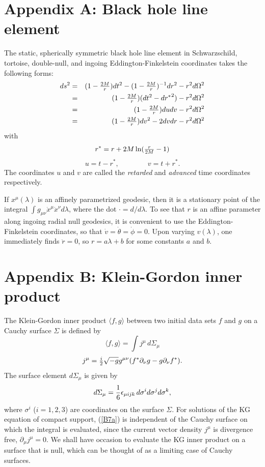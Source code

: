 \documentclass[12pt]{article}
\def\la{\langle}
\def\ra{\rangle}
\begin{document}
\section*{Appendix A: Black hole line element}

The static, spherically symmetric black hole line element
in Schwarzschild, tortoise, double-null, and ingoing
Eddington-Finkelstein coordinates takes the following forms:
\begin{eqnarray} ds^2&=
&(1-{\textstyle{2M\over r}}) dt^2
-(1-{\textstyle{2M\over r}})^{-1} dr^2
-r^2d\Omega^2\\
&=&(1-{\textstyle{2M\over r}}) (dt^2-d{r^*}^2)-r^2d\Omega^2\\
&=&(1-{\textstyle{2M\over r}}) dudv- r^2d\Omega^2\\
&=& (1-{\textstyle{2M\over r}}) dv^2-2 dvdr-r^2d\Omega^2
\end{eqnarray}
with
\begin{equation}
r^*=r+2M\ln({\textstyle{r\over2M}}-1)
\label{tortoise}
\end{equation}
\begin{equation}u=t-r^*,\qquad\qquad v=t+r^*.
\label{uv}
\end{equation}
The coordinates $u$ and $v$ are called the {\it retarded} and
{\it advanced} time coordinates respectively.

If $x^{\mu}(\lambda)$ is an affinely parametrized
geodesic, then it is a stationary point of the integral
$\int g_{\mu\nu}\dot{x}^{\mu}\dot{x}^{\nu} d\lambda$, where
the dot $\cdot=d/d\lambda$.
To see that $r$ is an affine parameter along ingoing radial
null geodesics, it is convenient to use the
Eddington-Finkelstein coordinates, so that
$\dot{v}=\dot{\theta}=\dot{\phi}=0$. Upon varying
$v(\lambda)$, one immediately finds $\ddot{r}=0$,
so $r=a\lambda+b$ for some constants $a$
and $b$.

\section*{Appendix B: Klein-Gordon inner product}

The Klein-Gordon inner product $\la f,g\ra$ between two
initial data sets $f$ and $g$ on a Cauchy
surface $\Sigma$ is defined by
\begin{equation}
\la f,g\ra=\int j^\mu \, d\Sigma_{\mu}
\label{B7a}
\end{equation}
\begin{equation}
j^\mu= {\textstyle {i\over2}}\sqrt{-g}g^{\mu\nu}(f^*\partial_\nu
g-g\partial_\nu f^*).
\end{equation}
The surface element $d\Sigma_\mu$ is given by
\begin{equation}
d\Sigma_\mu={1\over6}\epsilon_{\mu ijk}\, d\sigma^i
d\sigma^j d\sigma^k,
\end{equation}
where $\sigma^i$ ($i=1,2,3$) are coordinates on the surface
$\Sigma$. For solutions of the KG equation of compact
support, (\ref{B7a}) is independent of the Cauchy surface on which
the integral is evaluated, since the current vector density
$j^\mu$ is divergence free, $\partial_\mu j^\mu=0$.
We shall have occasion to evaluate the KG inner product on a
surface that is null, which can be thought of as a limiting
case of Cauchy surfaces.
\end{document}

